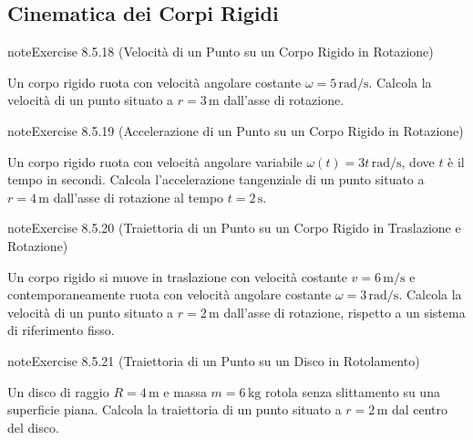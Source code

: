 \documentclass[letterpaper,10pt,italian]{jupyterBook}
\begin{document}
\subsection{Cinematica dei Corpi Rigidi}
\label{\detokenize{ch/mechanics/kinematics-problems:cinematica-dei-corpi-rigidi}} \label{exercise:ch/mechanics/kinematics-problems-exercise-17}

\begin{sphinxadmonition}{note}{Exercise 8.5.18 (Velocità di un Punto su un Corpo Rigido in Rotazione)}



\sphinxAtStartPar
Un corpo rigido ruota con velocità angolare costante \(\omega = 5 \, \text{rad/s}\). Calcola la velocità di un punto situato a \(r = 3 \, \text{m}\) dall’asse di rotazione.
\end{sphinxadmonition}
 \label{exercise:ch/mechanics/kinematics-problems-exercise-18}

\begin{sphinxadmonition}{note}{Exercise 8.5.19 (Accelerazione di un Punto su un Corpo Rigido in Rotazione)}



\sphinxAtStartPar
Un corpo rigido ruota con velocità angolare variabile \(\omega(t) = 3t \, \text{rad/s}\), dove \(t\) è il tempo in secondi. Calcola l’accelerazione tangenziale di un punto situato a \(r = 4 \, \text{m}\) dall’asse di rotazione al tempo \(t = 2 \, \text{s}\).
\end{sphinxadmonition}
 \label{exercise:ch/mechanics/kinematics-problems-exercise-19}

\begin{sphinxadmonition}{note}{Exercise 8.5.20 (Traiettoria di un Punto su un Corpo Rigido in Traslazione e Rotazione)}



\sphinxAtStartPar
Un corpo rigido si muove in traslazione con velocità costante \(v = 6 \, \text{m/s}\) e contemporaneamente ruota con velocità angolare costante \(\omega = 3 \, \text{rad/s}\). Calcola la velocità di un punto situato a \(r = 2 \, \text{m}\) dall’asse di rotazione, rispetto a un sistema di riferimento fisso.
\end{sphinxadmonition}
 \label{exercise:ch/mechanics/kinematics-problems-exercise-20}

\begin{sphinxadmonition}{note}{Exercise 8.5.21 (Traiettoria di un Punto su un Disco in Rotolamento)}



\sphinxAtStartPar
Un disco di raggio \(R = 4 \, \text{m}\) e massa \(m = 6 \, \text{kg}\) rotola senza slittamento su una superficie piana. Calcola la traiettoria di un punto situato a \(r = 2 \, \text{m}\) dal centro del disco.
\end{sphinxadmonition}
 \label{exercise:ch/mechanics/kinematics-problems-exercise-21}
\end{document}
